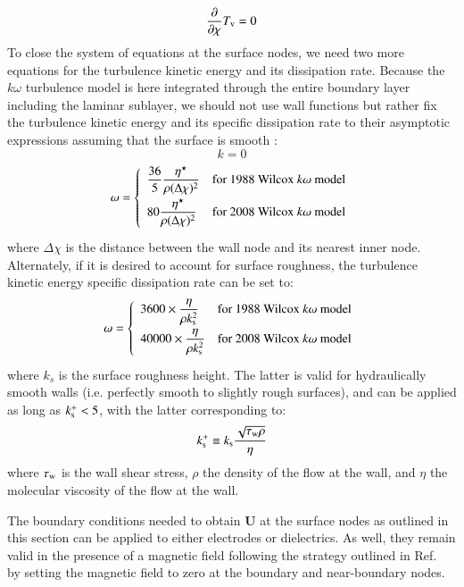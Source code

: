 \documentclass{warpdoc}
\newcommand{\alb}{\vspace{0.1cm}\\} %
\newcommand{\mfd}{\displaystyle}
\renewcommand{\vec}[1]{\bm{#1}}
\begin{document}
%
\begin{equation}
 \frac{\partial }{\partial \chi}T_{\rm v}=0 
\end{equation}
%
To close the system of equations at the surface nodes, we need two more equations for the turbulence kinetic energy and its dissipation rate. Because the $k\omega$ turbulence model is here integrated through the entire boundary layer including the laminar sublayer, we should not use wall functions but rather fix the turbulence kinetic energy and its specific dissipation rate to their asymptotic expressions assuming that the surface is smooth \cite{aiaa:1988:wilcox}:
%
\begin{equation}
k=0
\end{equation}
%
%
\begin{equation}
\omega=\left\{ 
\begin{array}{ll}\mfd
\frac{36}{5} \frac{\eta^\star}{\rho (\Delta \chi)^2 } & \textrm{for 1988 Wilcox $k\omega$ model} \alb\mfd
80 \frac{\eta^\star}{\rho (\Delta \chi)^2 } & \textrm{for 2008 Wilcox $k\omega$ model} \alb
\end{array}
\right.
\end{equation}
%
where $\Delta \chi$ is the distance between the wall node and its nearest inner node. Alternately, if it is desired to account for surface roughness, the turbulence kinetic energy specific dissipation rate can be set to:\cite{aiaa:2008:wilcox}
%
\begin{eqnarray}
\omega=\left\{ 
\begin{array}{ll}\mfd
3600 \times \frac{\eta}{\rho k_{\rm s}^2} & \textrm{for 1988 Wilcox $k\omega$ model} \alb\mfd
40000 \times \frac{\eta}{\rho k_{\rm s}^2} & \textrm{for 2008 Wilcox $k\omega$ model} \alb
\end{array}
\right.
\end{eqnarray}
%
where $k_s$ is the surface roughness height. The latter is valid for hydraulically smooth walls (i.e. perfectly smooth to slightly rough surfaces), and can be applied as long as $k_{\rm s}^+<5$, with the latter corresponding to:
%
\begin{equation}
k_{\rm s}^+ \equiv k_{\rm s} \frac{\sqrt{\tau_{\rm w}\rho}  }{\eta}
\end{equation}
%
where $\tau_{\rm w}$ is the wall shear stress, $\rho$ the density of the flow at the wall, and $\eta$ the molecular viscosity of the flow at the wall.


The boundary conditions needed to obtain $\vec{U}$ at the surface nodes as outlined in this section can be applied to either electrodes or dielectrics. As well, they remain valid in the presence of a magnetic field following the strategy outlined in Ref.\ \cite{jcp:2015:parent} by setting the magnetic field to zero at the boundary and near-boundary nodes.  
\end{document}
